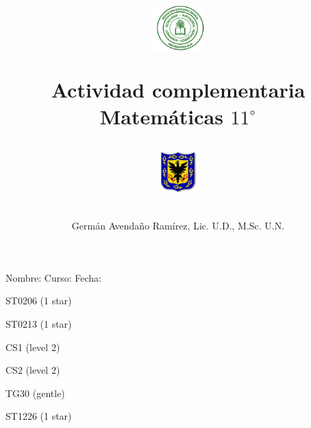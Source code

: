 \documentclass[10pt,twoside]{article}
\author{Germ\'an Avenda\~no Ram\'irez, Lic. U.D., M.Sc. U.N.}
\title{\begin{minipage}{.2\textwidth}
\includegraphics[height=1.75cm]{Images/logo-colegio.png}\end{minipage}
\begin{minipage}{.55\textwidth}
\begin{center}
Actividad complementaria  \\
Matemáticas $11^{\circ}$
\end{center}
\end{minipage}\hfill
\begin{minipage}{.2\textwidth}
\includegraphics[height=1.75cm]{Images/logo-sed.png} 
\end{minipage}}
\date{}
\begin{document}
\maketitle
Nombre: \hrulefill Curso: \underline{\hspace*{44pt}} Fecha: \underline{\hspace*{2.5cm}}
\vspace*{12pt}
\cluefont{\Large}

\begin{minipage}{0.45\linewidth}\begin{center}
ST0206 (1 star) \\
\end{center}\end{minipage}\hfill
\begin{minipage}{0.45\linewidth}\begin{center}
ST0213 (1 star) \\
\end{center}\end{minipage}

\begin{minipage}{0.45\linewidth}\begin{center}
CS1 (level 2) \\
\end{center}\end{minipage}\hfill
\begin{minipage}{0.45\linewidth}\begin{center}
CS2 (level 2) \\
\end{center}\end{minipage}

\begin{minipage}{0.95\linewidth}\begin{center}
TG30 (gentle) \\
\end{center}\end{minipage}\hfill
\begin{minipage}{0.45\linewidth}\begin{center}
ST1226 (1 star) \\
\end{center}\end{minipage}
\end{document}
